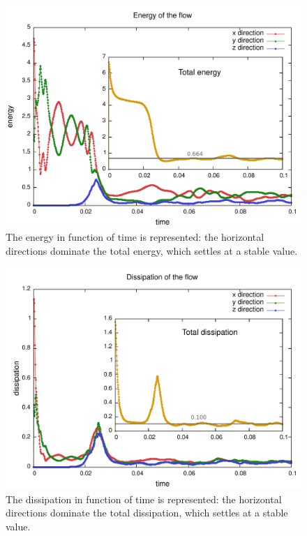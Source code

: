 \begin{figure}[ht]
    \includegraphics[width=\textwidth]{data/3D_model/thermalization/energy}
    \caption{The energy in function of time is represented: the horizontal directions dominate the total energy, which settles at a stable value.}
    \label{fig:therm_energy}
\end{figure}
    
\begin{figure}[ht]
    \includegraphics[width=\textwidth]{data/3D_model/thermalization/dissipation}
    \caption{The dissipation in function of time is represented: the horizontal directions dominate the total dissipation, which settles at a stable value.}
    \label{fig:therm_dissip}
\end{figure}
    
